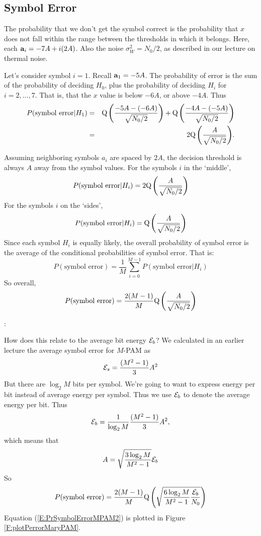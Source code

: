 \subsection{Symbol Error}

The probability that we don't get the symbol correct is the
probability that $x$ does not fall within the range between the
thresholds in which it belongs.  Here, each $\mathbf{a}_i = -7A + i(2A)$.  Also the
noise $\sigma_W^2 = N_0/2$, as described in our lecture on thermal noise.

Let's consider symbol $i=1$.  Recall $\mathbf{a}_1 = -5A$.  The probability of error is the sum of the probability of deciding $H_0$, plus the probability of deciding $H_i$ for $i=2, \ldots, 7$.  That is, that the $x$ value is below $-6A$, or above $-4A$.  Thus
\begin{eqnarray}
  P(\mbox{symbol error}| H_1) 
    &=& {\mbox{Q}\left( {\frac{-5A - (-6A) }{\sqrt{N_0/2}}} \right)} + {\mbox{Q}\left( {\frac{-4A - (-5A) }{\sqrt{N_0/2}}} \right)}
  \nonumber \\  
    &=& 2 {\mbox{Q}\left( {\frac{A }{\sqrt{N_0/2}}} \right)}.
\end{eqnarray}

Assuming neighboring symbols $a_i$ are spaced by $2A$, the decision
threshold is always $A$ away from the symbol values. For the symbols
$i$ in the `middle',
\[
  P(\mbox{symbol error}| H_i) = 2 {\mbox{Q}\left( {\frac{A }{\sqrt{N_0/2}}} \right)}
\]
For the symbols $i$ on the `sides',
\[
  P(\mbox{symbol error}| H_i) = {\mbox{Q}\left( {\frac{A }{\sqrt{N_0/2}}} \right)}
\]
Since each symbol $H_i$ is equally likely, the overall probability of symbol error is the average of the conditional probabilities of symbol error.  That is:
\[
  P(\mbox{symbol error}) = \frac{1}{M} \sum_{i=0}^{M-1} P(\mbox{symbol error}| H_i)
\]
So overall,
\[
  P(\mbox{symbol error}) = \frac{2(M-1)}{M} {\mbox{Q}\left( {\frac{A }{\sqrt{N_0/2}}} \right)}
\]

:

How does this relate to the average bit energy $\mathcal{E}_b$?  We calculated in an earlier lecture the average symbol error for $M$-PAM as
\[
\mathcal{E}_s = \frac{(M^2-1)}{3} A^2
\]
But there are $\log_2 M$ bits per symbol.  We're going to want to express energy per bit instead of average energy per symbol.  Thus we use $\mathcal{E}_b$ to denote the average energy per bit.  Thus
\begin{equation}
\mathcal{E}_b = \frac{1}{\log_2 M} \frac{(M^2-1)}{3} A^2,    
\end{equation}
which means that
\[
A  = \sqrt{\frac{3 \log_2 M}{M^2-1}} \mathcal{E}_b
\]
So
\begin{equation} \label{E:PrSymbolErrorMPAM2}
  P(\mbox{symbol error}) = \frac{2(M-1)}{M} {\mbox{Q}\left( {\sqrt{\frac{6 \log_2 M}{M^2-1} \frac{\mathcal{E}_b}{N_0}}} \right)}
\end{equation}
Equation (\ref{E:PrSymbolErrorMPAM2}) is plotted in Figure
\ref{F:plotPerrorMaryPAM}.

